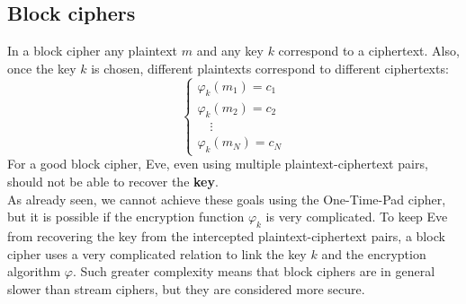 \documentclass[a4paper, 10pt, titlepage]{article}
\begin{document}
\subsection{Block ciphers}
In a block cipher any plaintext $m$ and any key $k$ correspond to a ciphertext. Also, once the key $k$ is chosen, different plaintexts correspond to different ciphertexts:
\begin{equation}
	\begin{cases}
 	\varphi_k (m_1) = c_1 \\
 	\varphi_k (m_2) = c_2 \\
 	\quad \vdots \\
 	\varphi_k (m_N) = c_N
 	\end{cases}
\end{equation} 
For a good block cipher, Eve, even using multiple plaintext-ciphertext pairs, should not be able to recover the \textbf{key}. \\
As already seen, we cannot achieve these goals using the One-Time-Pad
cipher, but it is possible if the encryption function $\varphi_k$ is very complicated.
To keep Eve from recovering the key from the intercepted plaintext-ciphertext pairs, a block cipher uses a very complicated relation to link the key $k$ and the encryption algorithm $\varphi$.
Such greater complexity means that block ciphers are in general slower than stream ciphers, but they are considered more secure.
\end{document}
